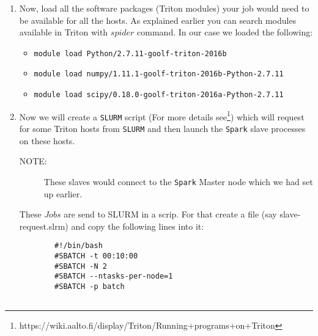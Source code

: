 \documentclass[a4paper,11pt]{article}
\begin{document}
\begin{enumerate}
	\item Now, load all the software packages (Triton modules) your job would need to be available for all the hosts. As explained earlier you can search modules available in Triton with $spider$ command. In our case we loaded the following:
	\begin{itemize}
		\item \texttt{module load Python/2.7.11-goolf-triton-2016b}
		\item \texttt{module load numpy/1.11.1-goolf-triton-2016b-Python-2.7.11}
		\item \texttt{module load scipy/0.18.0-goolf-triton-2016a-Python-2.7.11}
	\end{itemize}
	\item Now we will create a \texttt{SLURM} script (For more details see\footnote{https://wiki.aalto.fi/display/Triton/Running+programs+on+Triton}) which will request for some Triton hosts from \texttt{SLURM} and then launch the \texttt{Spark} slave processes on these hosts. 
	\begin{description}
		\item[NOTE:]These slaves would connect to the \texttt{Spark} Master node which we had set up earlier. 
	\end{description}
	These $Jobs$ are send to SLURM in a scrip. For that create a file (say slave-request.slrm) and copy the following lines into it:
	\begin{listing}
		\begin{verbatim}
		#!/bin/bash
		#SBATCH -t 00:10:00
		#SBATCH -N 2
		#SBATCH --ntasks-per-node=1
		#SBATCH -p batch
		

\end{verbatim}
\end{listing}
\end{enumerate}
\end{document}
